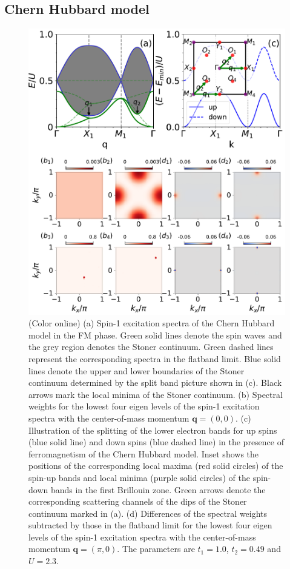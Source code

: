 \documentclass[amsmath,superscriptaddress,showpacs,aps,prb,twocolumn]{revtex4-1}
\begin{document}
\subsection{Chern Hubbard model}\label{CHM}
\begin{figure}
\includegraphics[width=\columnwidth]{fmcispectrum}
\caption{(Color online) (a) Spin-1 excitation spectra of the Chern Hubbard model in the FM phase. Green solid lines denote the spin waves and the grey region denotes the Stoner continuum. Green dashed lines represent the corresponding spectra in the flatband limit. Blue solid lines denote the upper and lower boundaries of the Stoner continuum determined by the split band picture shown in (c). Black arrows mark the local minima of the Stoner continuum. (b) Spectral weights for the lowest four eigen levels of the spin-1 excitation spectra with the center-of-mass momentum $\mathbf{q}=(0,0)$. (c) Illustration of the splitting of the lower electron bands for up spins (blue solid line) and down spins (blue dashed line) in the presence of ferromagnetism of the Chern Hubbard model. Inset shows the positions of the corresponding local maxima (red solid circles) of the spin-up bands and local minima (purple solid circles) of the spin-down bands in the first Brillouin zone. Green arrows denote the corresponding scattering channels of the dips of the Stoner continuum marked in (a). (d) Differences of the spectral weights subtracted by those in the flatband limit for the lowest four eigen levels of the spin-1 excitation spectra with the center-of-mass momentum $\mathbf{q}=(\pi,0)$. The parameters are $t_1=1.0$, $t_2=0.49$ and $U=2.3$.}
\label{fmcispectrum}
\end{figure}
\end{document}
